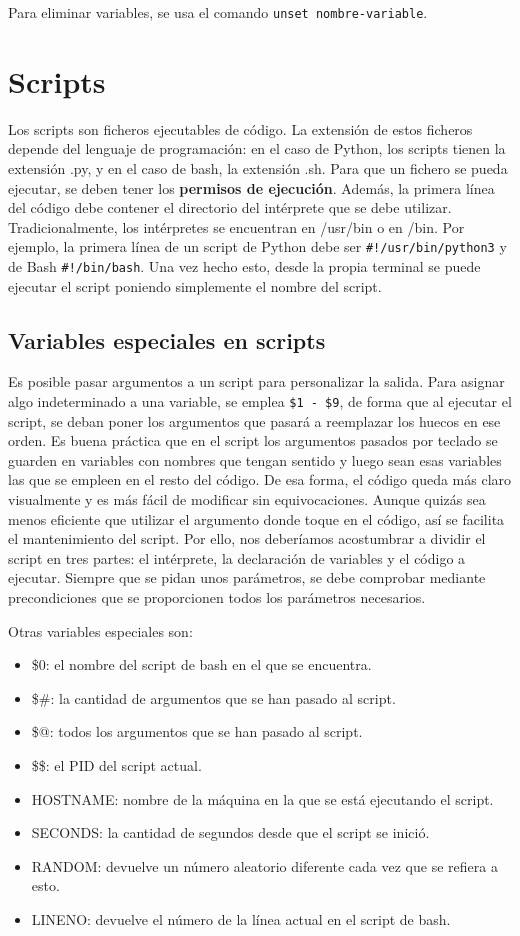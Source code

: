 Para eliminar variables, se usa el comando \texttt{unset nombre-variable}.  \ 

\section{Scripts}
Los scripts son ficheros ejecutables de código. La extensión de estos ficheros depende del lenguaje de programación: en el caso de Python, los scripts tienen la extensión .py, y en el caso de bash, la extensión .sh. Para que un fichero se pueda ejecutar, se deben tener los \textbf{permisos de ejecución}. Además, la primera línea del código debe contener el directorio del intérprete que se debe utilizar. Tradicionalmente, los intérpretes se encuentran en /usr/bin o en /bin. Por ejemplo, la primera línea de un script de Python debe ser \texttt{\#!/usr/bin/python3} y de Bash \texttt{\#!/bin/bash}. Una vez hecho esto, desde la propia terminal se puede ejecutar el script poniendo simplemente el nombre del script.

\subsection{Variables especiales en scripts}
Es posible pasar argumentos a un script para personalizar la salida. Para asignar algo indeterminado a una variable, se emplea \texttt{\$1 - \$9}, de forma que al ejecutar el script, se deban poner los argumentos que pasará a reemplazar los huecos en ese orden. Es buena práctica que en el script los argumentos pasados por teclado se guarden en variables con nombres que tengan sentido y luego sean esas variables las que se empleen en el resto del código. De esa forma, el código queda más claro visualmente y es más fácil de modificar sin equivocaciones. Aunque quizás sea menos eficiente que utilizar el argumento donde toque en el código, así se facilita el mantenimiento del script. Por ello, nos deberíamos acostumbrar a dividir el script en tres partes: el intérprete, la declaración de variables y el código a ejecutar. Siempre que se pidan unos parámetros, se debe comprobar mediante precondiciones que se proporcionen todos los parámetros necesarios. 

Otras variables especiales son: \begin{itemize}
\item \$0: el nombre del script de bash en el que se encuentra.
\item \$\#: la cantidad de argumentos que se han pasado al script.
\item \$@: todos los argumentos que se han pasado al script.
\item \$\$: el PID del script actual.
\item HOSTNAME: nombre de la máquina en la que se está ejecutando el script. 
\item SECONDS: la cantidad de segundos desde que el script se inició. 
\item RANDOM: devuelve un número aleatorio diferente cada vez que se refiera a esto.
\item LINENO: devuelve el número de la línea actual en el script de bash.
\end{itemize}

